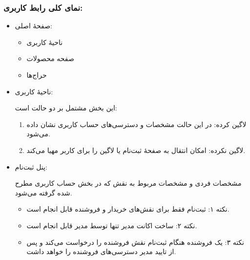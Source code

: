 \documentclass[]{article}
\begin{document}
\newpage

\subsubsection*{{\titr نمای کلی رابط کاربری:}}

\begin{itemize}

\item
صفحهٔ اصلی:

\begin{itemize}

\item
ناحیهٔ کاربری

\item
صفحه محصولات

\item
حراج‌ها

\end{itemize}

\item
ناحیهٔ‌ کاربری:

این بخش مشتمل بر دو حالت است:

\begin{enumerate}

\item
لاگین کرده: در این حالت مشخصات و دسترسی‌های حساب کاربری نشان داده می‌شود.

\item
لاگین نکرده: امکان انتقال به صفحهٔ ثبت‌نام یا لاگین را برای کاربر مهیا می‌کند.
\end{enumerate}


\item
پنل ثبت‌نام:

مشخصات فردی و مشخصات مربوط به نقش که در بخش حساب کاربری مطرح شده گرفته می‌شود.

\begin{itemize}[label={$\blacksquare$}]
\item
نکته ۱: ثبت‌نام فقط برای نقش‌های خریدار و فروشنده قابل انجام است.

\item
نکته ۲: ساخت اکانت مدیر تنها توسط مدیر قابل انجام است.

\item
نکته ۳: یک فروشنده هنگام ثبت‌نام نقش فروشنده را درخواست می‌کند و پس از تایید مدیر دسترسی‌های فروشنده را خواهد داشت.

\end{itemize}


\end{itemize}
\end{document}
